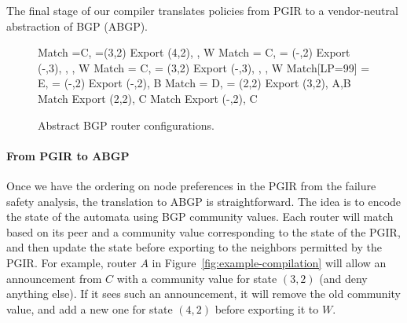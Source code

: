 \documentclass[10pt]{sigalternate052015}
\newcommand{\para}[1]{\paragraph*{\textbf{#1}}}
\begin{document}

The final stage of our compiler translates policies from PGIR to a vendor-neutral abstraction of BGP (ABGP).

\begin{figure}[t!]
\begin{code}
    Match \PEER=C, \COMM=(3,2)
      Export \COMM \Arrow (4,2), 
             \MED {}, \PEER \Arrow W
    Match \PEER = C, \COMM = (-,2)
      Export \COMM \Arrow (-,3), \COMM \Arrow {},
             \MED {}, \PEER \Arrow W
    Match \PEER = C, \COMM = (3,2)
      Export \COMM \Arrow (-,3), \COMM \Arrow {},
             \MED {}, \PEER \Arrow W
    Match[LP=99] \PEER = E, \COMM = (-,2) 
      Export \COMM \Arrow (-,2), \PEER \Arrow B
    Match \PEER = D, \COMM = (2,2)
      Export \COMM \Arrow (3,2), \PEER \Arrow A,B
    Match 
      Export \COMM \Arrow (2,2), \PEER \Arrow C
    Match 
      Export \COMM \Arrow (-,2), \PEER \Arrow C
  \end{code}
  \vspace{-2em} 
  \caption{Abstract BGP router configurations. \label{fig:abgp-config}}
  \vspace{-1em}
\end{figure}

\para{From PGIR to ABGP}

Once we have the ordering on node preferences in the PGIR from the failure safety analysis, the translation to ABGP is straightforward. The idea is to encode the state of the automata using BGP community values. Each router will match based on its peer and a community value corresponding to the state of the PGIR, and then update the state before exporting to the neighbors permitted by the PGIR. For example, router $A$ in Figure~\ref{fig:example-compilation} will allow an announcement from $C$ with a community value for state $(3,2)$ (and deny anything else). If it sees such an announcement, it will remove the old community value, and add a new one for state $(4,2)$ before exporting it to $W$.
\end{document}
